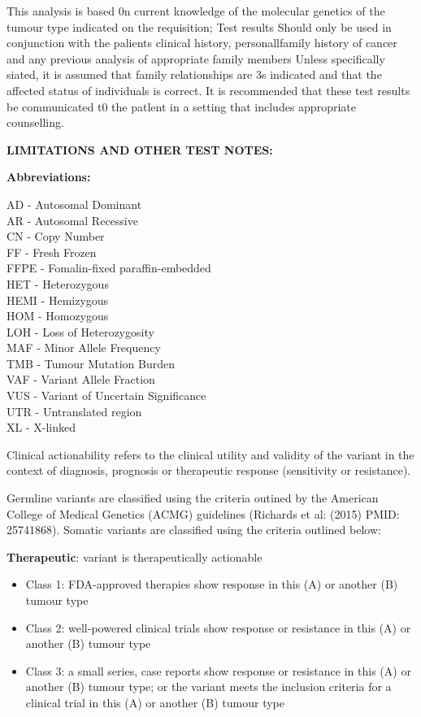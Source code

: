 \documentclass[8pt,letterpaper]{extarticle}
\begin{document}
{This analysis is based 0n current knowledge of the molecular genetics of the tumour type indicated on the requisition; Test results Should only be used in conjunction with the palients clinical history, personallfamily history of cancer and any previous analysis of appropriate family members Unless specifically siated, it is assumed that family relationships are 3s indicated and that the affected status of individuals is correct. It is recommended that these test results be communicated t0 the patlent in a setting that includes appropriate counselling.

{\bf LIMITATIONS AND OTHER TEST NOTES:}

{\bf Abbreviations:}

AD - Autosomal Dominant \\
AR - Autosomal Recessive \\
CN - Copy Number \\
FF - Fresh Frozen \\
FFPE - Fomalin-fixed paraffin-embedded \\
HET - Heterozygous \\
HEMI - Hemizygous \\
HOM - Homozygous \\
LOH - Loss of Heterozygosity\\
MAF - Minor Allele Frequency \\
TMB - Tumour Mutation Burden \\
VAF - Variant Allele Fraction \\
VUS - Variant of Uncertain Significance \\
UTR - Untranslated region \\
XL - X-linked

Clinical actionability refers to the clinical utility and validity of the variant in the context of diagnosis, prognosis or therapeutic response (sensitivity or resistance).

Germline variants are classified using the criteria outined by the American College of Medical Genetics (ACMG) guidelines (Richards et al: (2015) PMID: 25741868). Somatic variants are classified using the criteria outlined below: 

{\bf Therapeutic}: variant is therapeutically actionable 
\begin{itemize}
  \setlength\itemsep{1pt}
  \item Class 1: FDA-approved therapies show response in this (A) or another (B) tumour type 
  \item Class 2: well-powered clinical trials show response or resistance in this (A) or another (B) tumour type 
  \item Class 3: a small series, case reports show response or resistance in this (A) or another (B) tumour type; or the variant meets the inclusion criteria for a clinical trial in this (A) or another (B) tumour type 
\end{itemize}

}
\end{document}
